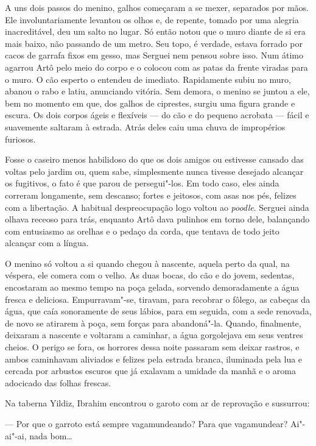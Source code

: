 A uns dois passos do menino, galhos começaram a se mexer, separados por
mãos. Ele involuntariamente levantou os olhos e, de repente, tomado por
uma alegria inacreditável, deu um salto no lugar. Só então notou que o
muro diante de si era mais baixo, não passando de um metro. Seu topo, é
verdade, estava forrado por cacos de garrafa fixos em gesso, mas Serguei
nem pensou sobre isso. Num átimo agarrou Artô pelo meio do corpo e o
colocou com as patas da frente viradas para o muro. O cão esperto o
entendeu de imediato. Rapidamente subiu no muro, abanou o rabo e latiu,
anunciando vitória. Sem demora, o menino se juntou a ele, bem no momento
em que, dos galhos de ciprestes, surgiu uma figura grande e escura. Os
dois corpos ágeis e flexíveis --- do cão e do pequeno acrobata --- fácil
e suavemente saltaram à estrada. Atrás deles caiu uma chuva de
impropérios furiosos.

Fosse o caseiro menos habilidoso do que os dois amigos ou estivesse
cansado das voltas pelo jardim ou, quem sabe, simplesmente nunca tivesse
desejado alcançar os fugitivos, o fato é que parou de persegui"-los. Em
todo caso, eles ainda correram longamente, sem descanso; fortes e
jeitosos, com asas nos pés, felizes com a libertação. A habitual
despreocupação logo voltou ao \emph{poodle}. Serguei ainda olhava
receoso para trás, enquanto Artô dava pulinhos em torno dele, balançando
com entusiasmo as orelhas e o pedaço da corda, que tentava de todo jeito
alcançar com a língua.

O menino só voltou a si quando chegou à nascente, aquela perto da qual,
na véspera, ele comera com o velho. As duas bocas, do cão e do jovem,
sedentas, encostaram ao mesmo tempo na poça gelada, sorvendo
demoradamente a água fresca e deliciosa. Empurravam"-se, tiravam, para
recobrar o fôlego, as cabeças da água, que caía sonoramente de seus
lábios, para em seguida, com a sede renovada, de novo se atirarem à
poça, sem forças para abandoná"-la. Quando, finalmente, deixaram a
nascente e voltaram a caminhar, a água gorgolejava em seus ventres
cheios. O perigo se fora, os horrores dessa noite passaram sem deixar
rastros, e ambos caminhavam aliviados e felizes pela estrada branca,
iluminada pela lua e cercada por arbustos escuros que já exalavam a
umidade da manhã e o aroma adocicado das folhas frescas.

Na taberna Yildiz, Ibrahim encontrou o garoto com ar de reprovação e
sussurrou:

--- Por que o garroto está sempre vagamundeando? Para que vagamundear?
Ai"-ai"-ai, nada bom\ldots{}

